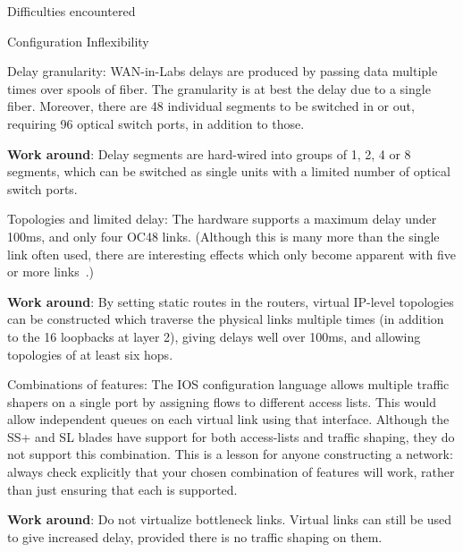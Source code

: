 \documentclass{IEEEtran}
\begin{document}
\begin{section}{Difficulties encountered}
\begin{subsection}{Configuration Inflexibility}
\begin{subsubsection}{Delay granularity}: WAN-in-Labs delays are produced by passing data
multiple times over spools of fiber.  The granularity is at best the
delay due to a single fiber.  Moreover, there are 48 individual segments
to be switched in or out, requiring 96 optical switch ports, in addition
to those.

{\bf Work around}: Delay segments are hard-wired into groups of 1,
2, 4 or 8 segments, which can be switched as single units with a limited
 number of optical switch ports.
\end{subsubsection}

\begin{subsubsection}{Topologies and limited delay}:
The hardware supports a maximum delay
under 100ms, and only four OC48 links.  (Although this is many more
than the single link often used, there are interesting effects which
only become apparent with five or more links~\cite{Heterogeneous}.)

{\bf Work around}:
By setting static routes in the routers, virtual IP-level topologies
can be constructed which traverse the physical links multiple times (in
addition to the 16 loopbacks at layer 2), giving delays well over 100ms,
and allowing topologies of at least six hops.
\end{subsubsection}

\begin{subsubsection}{Combinations of features}: The IOS configuration language allows
multiple traffic shapers on a single port by assigning flows to
different access lists.  This would allow independent queues on each
virtual link using that interface. Although the SS+ and SL blades have
support for both access-lists and traffic shaping, they do not support
this combination.  This is a lesson for anyone constructing a network:
always check explicitly that your chosen combination of features will
work, rather than just ensuring that each is supported.

{\bf Work around}:
Do not virtualize bottleneck links.  Virtual links can still be used to
give increased delay, provided there is no traffic shaping on them.
\end{subsubsection}
\end{subsection}

\end{section}
\end{document}
